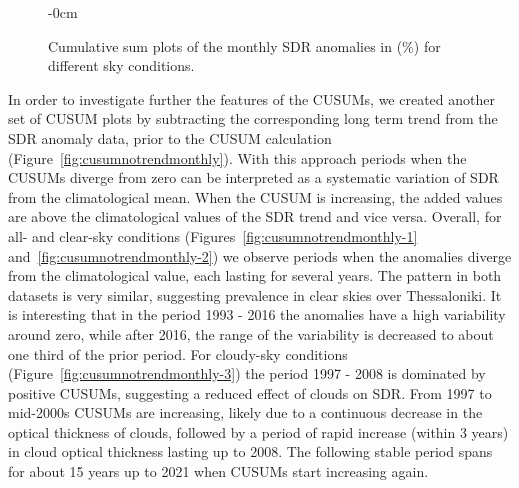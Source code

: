 \documentclass[applsci,article,submit,moreauthors,pdftex]{Definitions/mdpi}
\begin{document}
\begin{figure}[h!]
    \begin{adjustwidth}{-\extralength}{0cm}
        {\centering 
        \hfill
        \hfill
        \hfill
        }
\caption{Cumulative sum plots of the monthly SDR anomalies in (\%) for different sky conditions.}\label{fig:cusummonth}
\end{adjustwidth}
\end{figure}

In order to investigate further the features of the CUSUMs, we created
another set of CUSUM plots by subtracting the corresponding long term
trend from the SDR anomaly data, prior to the CUSUM calculation
(Figure~\ref{fig:cusumnotrendmonthly}). With this approach periods when
the CUSUMs diverge from zero can be interpreted as a systematic
variation of SDR from the climatological mean. When the CUSUM is
increasing, the added values are above the climatological values of the
SDR trend and vice versa. Overall, for all- and clear-sky conditions
(Figures~\ref{fig:cusumnotrendmonthly-1}
and~\ref{fig:cusumnotrendmonthly-2}) we observe periods when the
anomalies diverge from the climatological value, each lasting for
several years. The pattern in both datasets is very similar, suggesting
prevalence in clear skies over Thessaloniki. It is interesting that in
the period 1993 - 2016 the anomalies have a high variability around
zero, while after 2016, the range of the variability is decreased to
about one third of the prior period. For cloudy-sky conditions
(Figure~\ref{fig:cusumnotrendmonthly-3}) the period 1997 - 2008 is
dominated by positive CUSUMs, suggesting a reduced effect of clouds on
SDR. From 1997 to mid-2000s CUSUMs are increasing, likely due to a
continuous decrease in the optical thickness of clouds, followed by a
period of rapid increase (within 3 years) in cloud optical thickness
lasting up to 2008. The following stable period spans for about 15 years
up to 2021 when CUSUMs start increasing again.
\end{document}
